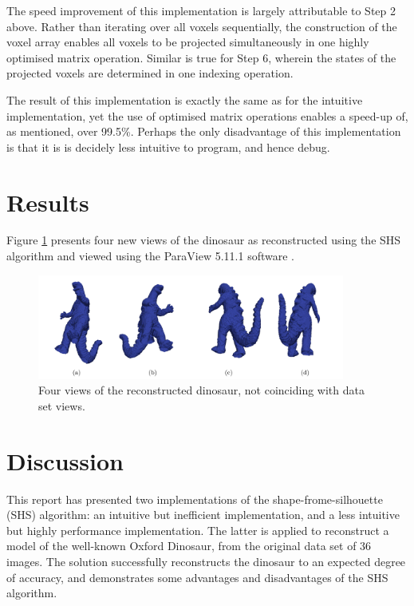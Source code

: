 The speed improvement of this implementation is largely attributable to Step 2 above. Rather than iterating over all voxels sequentially, the construction of the voxel array enables all voxels to be projected simultaneously in one highly optimised matrix operation. Similar is true for Step 6, wherein the states of the projected voxels are determined in one indexing operation.

The result of this implementation is exactly the same as for the intuitive implementation, yet the use of optimised matrix operations enables a speed-up of, as mentioned, over 99.5\%. Perhaps the only disadvantage of this implementation is that it is is decidely less intuitive to program, and hence debug.

\newpage
\section{Results}

Figure \ref{fig:dino_views} presents four new views of the dinosaur as reconstructed using the SHS algorithm and viewed using the ParaView 5.11.1 software \cite{kitware_2023}.

\begin{figure}[ht]
  \centering
  \includegraphics[width=0.9\textwidth]{images/q2_dino_views.png}
  \caption{Four views of the reconstructed dinosaur, not coinciding with data set views.}
  \label{fig:dino_views}
\end{figure}

\newpage
\section{Discussion}

This report has presented two implementations of the shape-frome-silhouette (SHS) algorithm: an intuitive but inefficient implementation, and a less intuitive but highly performance implementation. The latter is applied to reconstruct a model of the well-known Oxford Dinosaur, from the original data set of 36 images. The solution successfully reconstructs the dinosaur to an expected degree of accuracy, and demonstrates some advantages and disadvantages of the SHS algorithm.

